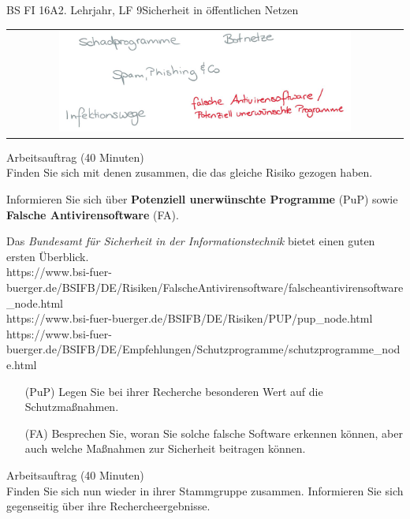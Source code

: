 \documentclass[oneside,openany,headings=optiontotoc,11pt,numbers=noenddot]{scrreprt}
\begin{document}
	\begin{worksheet}{BS FI 16A}{2. Lehrjahr, LF 9}{Sicherheit in öffentlichen Netzen}
		
		\begin{framed}
			\begin{tabular}{lcr}
				& \includegraphics[width=0.8\textwidth]{Bilder/AntivirUnwantedProg.jpg} & \\
			\end{tabular}
		\end{framed}
		\color{codegray}Arbeitsauftrag (40 Minuten)\\
		\color{black}
		Finden Sie sich mit denen zusammen, die das gleiche Risiko gezogen haben.
		\par
		\bigskip
		\noindent
		Informieren Sie sich über \textbf{Potenziell unerwünschte Programme} (PuP) sowie \textbf{Falsche Antivirensoftware} (FA).
		\par
		\bigskip
		\noindent
		Das \textit{Bundesamt für Sicherheit in der Informationstechnik} bietet einen guten ersten Überblick.\\
		\small{\color{codegray}https://www.bsi-fuer-buerger.de/BSIFB/DE/Risiken/FalscheAntivirensoftware/falscheantivirensoftware\_node.html\\
		https://www.bsi-fuer-buerger.de/BSIFB/DE/Risiken/PUP/pup\_node.html\\
		https://www.bsi-fuer-buerger.de/BSIFB/DE/Empfehlungen/Schutzprogramme/schutzprogramme\_node.html}
		\normalsize
		\begin{itemize}
			\item[(PuP)] Legen Sie bei ihrer Recherche besonderen Wert auf die Schutzmaßnahmen.
			\item[(FA)] Besprechen Sie, woran Sie solche falsche Software erkennen können, aber auch welche Maßnahmen zur Sicherheit beitragen können.
		\end{itemize}
		\par
		\bigskip
		\noindent
		
		\color{codegray}Arbeitsauftrag (40 Minuten)\\
		\color{black}
		Finden Sie sich nun wieder in ihrer Stammgruppe zusammen. Informieren Sie sich gegenseitig über ihre Rechercheergebnisse.
		

\end{worksheet}
\end{document}
